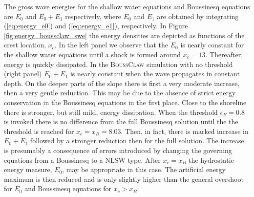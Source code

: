 \documentclass[review]{elsarticle}
\newcommand{\BoussClaw}{\textsc{BoussClaw} }
\begin{document}
The gross wave energies  
for the shallow water equations and Boussinesq equations
are $E_0$ and $E_0+E_1$  respectively, 
where $E_0$ and $E_1$ are obtained by integrating  (\ref{eq:energy_e0}) and (\ref{eq:energy_e1}), respectively. 
In Figure \ref{fig:energy_boussclaw_swe} the energy densities are depicted as 
functions of the crest location, $x_c$. 
In the left panel 
we observe that the $E_0$ is nearly constant 
for the shallow water equations until a shock is formed around $x_c=13$.
Thereafter, energy is quickly dissipated. 
In  the \BoussClaw simulation with no threshold (right panel) 
$E_0+E_1$ is nearly constant when the wave propagates in constant depth. 
On the deeper parts of the slope there is first a very moderate increase, then a
very gentle reduction. This may be due to the absence of strict energy  conservation in the Boussinesq equations in the first place. 
Close to the shoreline there is stronger, but still mild, energy dissipation.
When the threshold $\epsilon_B=0.8$ is invoked there is no difference from the full Boussinesq solution until the the threshold is reached for 
 $x_c=x_B=8.03$. Then, in fact, there is marked increase in $E_0+E_1$ followed by a stronger  reduction then for the full solution.
The increase is presumably a consequence of errors introduced by changing the 
governing equations from a Boussinesq to a NLSW type. 
After  $x_c=x_B$  
the hydrostatic energy measure, $E_0$, may be appropriate in this case.
The artificial energy maximum  is then reduced and is only slightly higher than
the general overshoot for $E_0$ and Boussinesq equations for $x_c>x_B$.  
\end{document}
